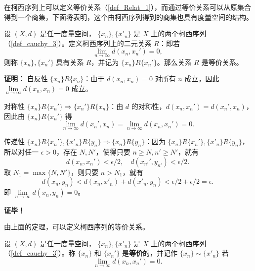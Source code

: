 
在柯西序列上可以定义等价关系（\autoref{def_Relat_1}），而通过等价关系可以从原集合得到一个商集，下面将表明，这个由柯西序列得到的商集也具有度量空间的结构。

\begin{theorem}{}
设 $(X,d)$ 是任一度量空间， $\{x_n\},\{x'_n\}$ 是 $X$ 上的两个柯西序列（\autoref{def_cauchy_3}）。定义柯西序列上的二元关系 $R$：即若
\begin{equation}
\lim_{n\rightarrow\infty}d(x_n,x_n')=0,~
\end{equation}
则称 $\{x_n\},\{x_n'\}$ 具有关系 $R$，并记为 $\{x_n\}R\{x_n'\}$。那么关系 $R$ 是等价关系。
\end{theorem}
\textbf{证明：}
自反性 $\{x_n\}R\{x_n\}$：由于 $d(x_n,x_n)=0$ 对所有 $n$ 成立，因此 $\lim\limits_{n\rightarrow\infty}d(x_n,x_n)=0$ 成立。

对称性 $\{x_n\}R\{x_n'\}\Rightarrow\{x_n'\}R\{x_n\}$：由 $d$ 的对称性，$d(x_n,x_n')=d(x_n',x_n)$，因此由 $\{x_n\}R\{x_n'\}$ 得 
\begin{equation}
\lim_{n\rightarrow\infty}d(x_n',x_n)=\lim_{n\rightarrow\infty}d(x_n,x_n')=0.~
\end{equation}

传递性 $\{x_n\}R\{x_n'\},\{x'_n\}R\{y_n\}\Rightarrow\{x_n\}R\{y_n\}$：因为 $\{x_n\}R\{x_n'\},\{x'_n\}R\{y_n\}$，所以对任一 $\epsilon>0$，存在 $N,N'$，使得只要 $n\geq N,n'\geq N'$，就有
\begin{equation}
d(x_n,x_n')<\epsilon/2,\quad d(x_{n'}',y_{n'})<\epsilon/2.~
\end{equation}
取 $N_1=\max\{N,N'\}$，则只要 $n>N_1$，就有
\begin{equation}
d(x_n,y_n)<d(x_n,x'_n)+d(x'_n,y_n)<\epsilon/2+\epsilon/2=\epsilon.~
\end{equation}
即 $\lim\limits_{n\rightarrow\infty}d(x_n,y_n)=0$。

\textbf{证毕！}

由上面的定理，可以定义柯西序列的等价关系。
\begin{definition}{}\label{def_CauEq_1}
设 $(X,d)$ 是任一度量空间， $\{x_n\},\{x'_n\}$ 是 $X$ 上的两个柯西序列（\autoref{def_cauchy_3}）。称 $\{x_n\}$ 和 $\{x_n'\}$ 是\textbf{等价}的，并记作 $\{x_n\}\sim\{x'_n\}$ 若
\begin{equation}
\lim_{n\rightarrow\infty}d(x_n,x_n')=0.~
\end{equation}
\end{definition}

